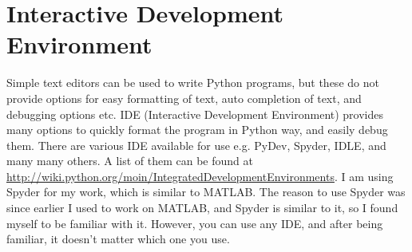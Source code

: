 \documentclass[10pt]{book}
\begin{document}
\section{Interactive Development Environment}
Simple text editors can be used to write Python programs, but these do not provide 
options for easy formatting of text, auto completion of text, and debugging options etc.  
IDE (Interactive Development Environment) provides many options to quickly format 
the program in Python way, and easily debug them. There are various IDE available 
for use e.g. PyDev, Spyder, IDLE, and many many others. A list of them can be 
found at \url{http://wiki.python.org/moin/IntegratedDevelopmentEnvironments}. 
I am using Spyder for my work, which is similar to MATLAB. The reason to use 
Spyder was since earlier I used to work on MATLAB, and Spyder is similar to it, 
so I found myself to be familiar with it. However, you can use any IDE, and after 
being familiar, it doesn't matter which one you use. 
\end{document}
